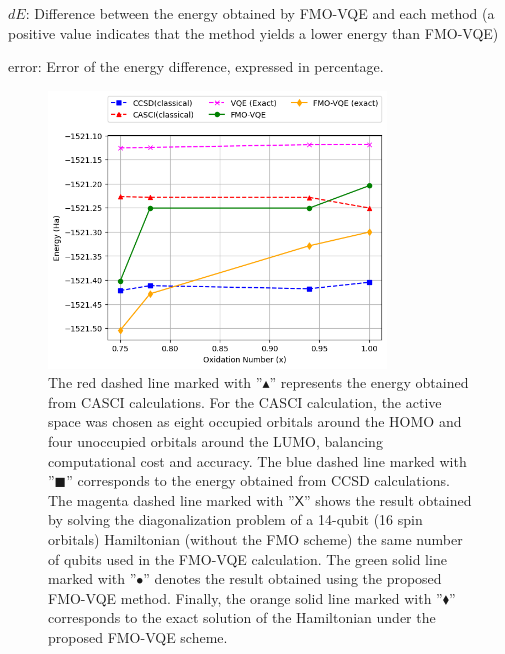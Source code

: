 \documentclass[pdflatex,sn-mathphys-num]{sn-jnl}%
\theoremstyle{thmstyleone}%
\theoremstyle{thmstyletwo}%
\theoremstyle{thmstylethree}%
\begin{document}
\begin{table}
$dE$\footnotemark[1] : {Difference between the energy obtained by FMO-VQE and each method (a positive value indicates that the method yields a lower energy than FMO-VQE)}

error\footnotemark[2] : {Error of the energy difference, expressed in percentage.}

\end{table}

\begin{figure}[htbp]
\centering
\includegraphics[width=0.8\textwidth]{fig/result2.png}
\caption{The red dashed line marked with $”\blacktriangle”$ represents the energy obtained from CASCI calculations. For the CASCI calculation, the active space was chosen as eight occupied orbitals around the HOMO and four unoccupied orbitals around the LUMO, balancing computational cost and accuracy. The blue dashed line marked with $”\blacksquare”$ corresponds to the energy obtained from CCSD calculations. The magenta dashed line marked with $”\mathsf{X}”$ shows the result obtained by solving the diagonalization problem of a 14-qubit (16 spin orbitals) Hamiltonian (without the FMO scheme) the same number of qubits used in the FMO-VQE calculation. The green solid line marked with $”\bullet”$ denotes the result obtained using the proposed FMO-VQE method. Finally, the orange solid line marked with $”\blacklozenge”$ corresponds to the exact solution of the Hamiltonian under the proposed FMO-VQE scheme.}\label{Fig.5}
\end{figure}
\end{document}
